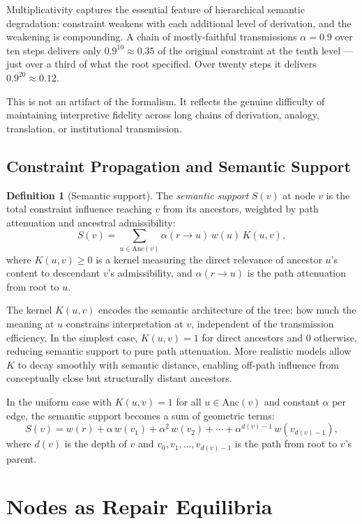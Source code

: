 \documentclass[11pt, a4paper]{article}
\theoremstyle{definition}
\newtheorem{definition}{Definition}
\theoremstyle{remark}
\begin{document}
Multiplicativity captures the essential feature of hierarchical semantic
degradation: constraint weakens with each additional level of derivation, and
the weakening is compounding. A chain of mostly-faithful transmissions
$\alpha = 0.9$ over ten steps delivers only $0.9^{10} \approx 0.35$ of the
original constraint at the tenth level --- just over a third of what the root
specified. Over twenty steps it delivers $0.9^{20} \approx 0.12$.

This is not an artifact of the formalism. It reflects the genuine difficulty
of maintaining interpretive fidelity across long chains of derivation, analogy,
translation, or institutional transmission.

\subsection{Constraint Propagation and Semantic Support}

\begin{definition}[Semantic support]
The \textit{semantic support} $S(v)$ at node $v$ is the total constraint
influence reaching $v$ from its ancestors, weighted by path attenuation and
ancestral admissibility:
\[
S(v) = \sum_{u \in \mathrm{Anc}(v)} \alpha(r \to u)\, w(u)\, K(u, v),
\]
where $K(u, v) \geq 0$ is a kernel measuring the direct relevance of ancestor
$u$'s content to descendant $v$'s admissibility, and $\alpha(r \to u)$ is
the path attenuation from root to $u$.
\end{definition}

The kernel $K(u, v)$ encodes the semantic architecture of the tree: how much
the meaning at $u$ constrains interpretation at $v$, independent of the
transmission efficiency. In the simplest case, $K(u, v) = 1$ for direct
ancestors and $0$ otherwise, reducing semantic support to pure path attenuation.
More realistic models allow $K$ to decay smoothly with semantic distance,
enabling off-path influence from conceptually close but structurally distant
ancestors.

In the uniform case with $K(u, v) = 1$ for all $u \in \mathrm{Anc}(v)$ and
constant $\alpha$ per edge, the semantic support becomes a sum of geometric
terms:
\[
S(v) = w(r) + \alpha\, w(v_1) + \alpha^2\, w(v_2) + \cdots + \alpha^{d(v)-1}\, w(v_{d(v)-1}),
\]
where $d(v)$ is the depth of $v$ and $v_0, v_1, \ldots, v_{d(v)-1}$ is the
path from root to $v$'s parent.

\section{Nodes as Repair Equilibria}
\end{document}
